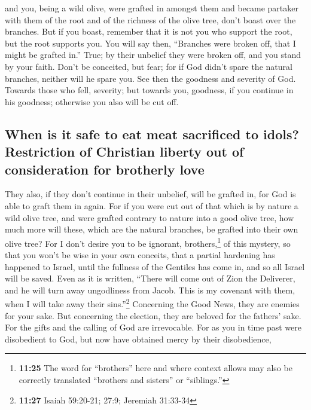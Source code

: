 and you, being a wild olive, were grafted in amongst them and became
partaker with them of the root and of the richness of the olive tree,
 don't boast over the branches. But if you boast,
remember that it is not you who support the root, but the root supports
you.  You will say then, ``Branches were broken off, that
I might be grafted in.''  True; by their unbelief they
were broken off, and you stand by your faith. Don't be conceited, but
fear;  for if God didn't spare the natural branches,
neither will he spare you.  See then the goodness and
severity of God. Towards those who fell, severity; but towards you,
goodness, if you continue in his goodness; otherwise you also will be
cut off.

\hypertarget{when-is-it-safe-to-eat-meat-sacrificed-to-idols-restriction-of-christian-liberty-out-of-consideration-for-brotherly-love}{%
\subsection{When is it safe to eat meat sacrificed to idols? Restriction
of Christian liberty out of consideration for brotherly
love}\label{when-is-it-safe-to-eat-meat-sacrificed-to-idols-restriction-of-christian-liberty-out-of-consideration-for-brotherly-love}}

 They also, if they don't continue in their unbelief,
will be grafted in, for God is able to graft them in again.
 For if you were cut out of that which is by nature a
wild olive tree, and were grafted contrary to nature into a good olive
tree, how much more will these, which are the natural branches, be
grafted into their own olive tree?  For I don't desire
you to be ignorant, brothers,\footnote{\textbf{11:25} The word for
  ``brothers'' here and where context allows may also be correctly
  translated ``brothers and sisters'' or ``siblings.''} of this mystery,
so that you won't be wise in your own conceits, that a partial hardening
has happened to Israel, until the fullness of the Gentiles has come in,
 and so all Israel will be saved. Even as it is written,
``There will come out of Zion the Deliverer, and he will turn away
ungodliness from Jacob.  This is my covenant with them,
when I will take away their sins.''\footnote{\textbf{11:27} Isaiah
  59:20-21; 27:9; Jeremiah 31:33-34}  Concerning the Good
News, they are enemies for your sake. But concerning the election, they
are beloved for the fathers' sake.  For the gifts and the
calling of God are irrevocable.  For as you in time past
were disobedient to God, but now have obtained mercy by their
disobedience,

